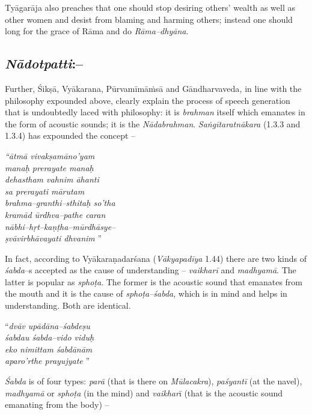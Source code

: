 Tyāgarāja also preaches that one should stop desiring others’ wealth as well as other women and desist from blaming and harming others; instead one should long for the grace of Rāma and do \textit{Rāma–dhyāna}.


\subsection*{\textit{Nādotpatti}:–}

Further, Śikṣā, Vyākarana, Pūrvamīmāṁsā and Gāndharvaveda\textit{,} in line with the philosophy expounded above, clearly explain the process of speech generation that is undoubtedly laced with philosophy: it is \textit{brahman} itself which emanates in the form of acoustic sounds; it is the \textit{Nādabrahman}. \textit{Saṅgītaratnākara} (1.3.3 and 1.3.4) has expounded the concept –

\begin{myquote}
\textit{“ātmā vivakṣamāno’yam}\\\textit{manaḥ prerayate manaḥ} \\\textit{dehastham vahnim āhanti}\\\textit{sa prerayati mārutam} \\\textit{brahma–granthi–sthitaḥ so’tha}\\\textit{kramād ūrdhva–pathe caran} \\\textit{nābhi–hṛt–kaṇṭha–mūrdhāsye–}\\\textit{ṣvāvirbhāvayati dhvanim} ”
\end{myquote}

\newpage

In fact, according to Vyākaraṇadarśana (\textit{Vākyapadīya} 1.44) there are two kinds of \textit{śabda}–s accepted as the cause of understanding – \textit{vaikharī} and \textit{madhyamā}. The latter is popular as \textit{sphoṭa}. The former is the acoustic sound that emanates from the mouth and it is the cause of \textit{sphoṭa–śabda}, which is in mind and helps in understanding. Both are identical.

\begin{myquote}
“\textit{dvāv upādāna–śabdeṣu}\\\textit{śabdau śabda–vido viduḥ} \\\textit{eko nimittam śabdānām}\\\textit{aparo’rthe prayujyate} ”
\end{myquote}

\textit{Śabda} is of four types: \textit{parā} (that is there on \textit{Mūlacakra}), \textit{paśyantī} (at the navel), \textit{madhyamā} or \textit{sphoṭa} (in the mind) and \textit{vaikhar}ī (that is the acoustic sound emanating from the body) –

